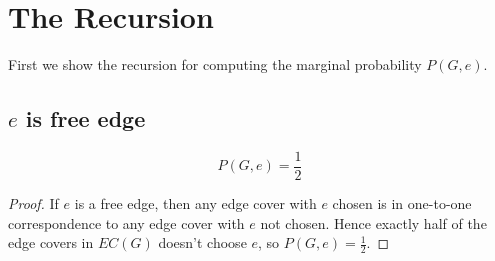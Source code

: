 \section{The Recursion}

First we show the recursion for computing the marginal probability $P(G, e)$.

\subsection{$e$ is free edge}
\begin{Prop}
	\[P(G,e) = \frac{1}{2}\]
\end{Prop}
\begin{proof}
	If $e$ is a free edge, then any edge cover with $e$ chosen is in one-to-one correspondence to any edge cover with $e$ not chosen. Hence exactly half of the edge covers in $EC(G)$ doesn't choose $e$, so $P(G, e) = \frac{1}{2}$.
\end{proof}

